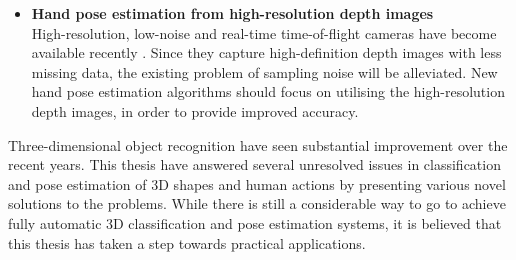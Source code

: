 \begin{itemize}
	\item \textbf{Hand pose estimation from high-resolution depth images}\\
	High-resolution, low-noise and real-time time-of-flight cameras have become available recently \cite{Nair2012}. Since they capture high-definition depth images with less missing data, the existing problem of sampling noise will be alleviated. New hand pose estimation algorithms should focus on utilising the high-resolution depth images, in order to provide improved accuracy.  
\end{itemize}

Three-dimensional object recognition have seen substantial improvement over the recent years.
This thesis have answered several unresolved issues in classification and pose estimation of 3D shapes and human actions by presenting various novel solutions to the problems. While there is still a considerable way to go to achieve fully automatic 3D classification and pose estimation systems, it is believed that this thesis has taken a step towards practical applications. 

